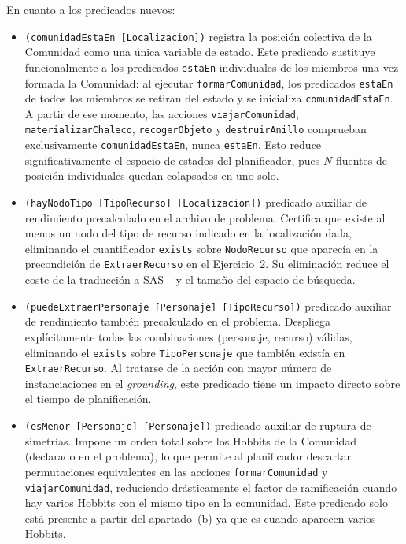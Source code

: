 \documentclass[10pt]{article}
\begin{document}
En cuanto a los predicados nuevos:
\begin{itemize}[label=-]
    \item \texttt{(comunidadEstaEn [Localizacion])} registra la posición colectiva de la Comunidad como una única variable de estado. Este predicado sustituye funcionalmente a los predicados \texttt{estaEn} individuales de los miembros una vez formada la Comunidad: al ejecutar \texttt{formarComunidad}, los predicados \texttt{estaEn} de todos los miembros se retiran del estado y se inicializa \texttt{comunidadEstaEn}. A partir de ese momento, las acciones \texttt{viajarComunidad}, \texttt{materializarChaleco}, \texttt{recogerObjeto} y \texttt{destruirAnillo} comprueban exclusivamente \texttt{comunidadEstaEn}, nunca \texttt{estaEn}. Esto reduce significativamente el espacio de estados del planificador, pues $N$ fluentes de posición individuales quedan colapsados en uno solo.
    \item \texttt{(hayNodoTipo [TipoRecurso] [Localizacion])} predicado auxiliar de rendimiento precalculado en el archivo de problema. Certifica que existe al menos un nodo del tipo de recurso indicado en la localización dada, eliminando el cuantificador \texttt{exists} sobre \texttt{NodoRecurso} que aparecía en la precondición de \texttt{ExtraerRecurso} en el Ejercicio~2. Su eliminación reduce el coste de la traducción a SAS+ y el tamaño del espacio de búsqueda.
    \item \texttt{(puedeExtraerPersonaje [Personaje] [TipoRecurso])} predicado auxiliar de rendimiento también precalculado en el problema. Despliega explícitamente todas las combinaciones (personaje, recurso) válidas, eliminando el \texttt{exists} sobre \texttt{TipoPersonaje} que también existía en \texttt{ExtraerRecurso}. Al tratarse de la acción con mayor número de instanciaciones en el \textit{grounding}, este predicado tiene un impacto directo sobre el tiempo de planificación.
    \item \texttt{(esMenor [Personaje] [Personaje])} predicado auxiliar de ruptura de simetrías. Impone un orden total sobre los Hobbits de la Comunidad (declarado en el problema), lo que permite al planificador descartar permutaciones equivalentes en las acciones \texttt{formarComunidad} y \texttt{viajarComunidad}, reduciendo drásticamente el factor de ramificación cuando hay varios Hobbits con el mismo tipo en la comunidad. Este predicado solo está presente a partir del apartado~(b) ya que es cuando aparecen varios Hobbits.
\end{itemize}
\end{document}
